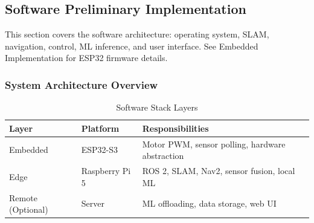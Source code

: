 
\subsection{Software Preliminary Implementation}


This section covers the software architecture: operating system, SLAM, navigation, control, ML inference, and user interface. See Embedded Implementation for ESP32 firmware details.

\subsubsection{System Architecture Overview}

\begin{table}[H]
\centering
\caption{Software Stack Layers}
\begin{tabular}{@{}llp{6cm}@{}}
\toprule
\textbf{Layer} & \textbf{Platform} & \textbf{Responsibilities} \\
\midrule
Embedded & ESP32-S3 & Motor PWM, sensor polling, hardware abstraction \\
Edge & Raspberry Pi 5 & ROS 2, SLAM, Nav2, sensor fusion, local ML \\
Remote (Optional) & Server & ML offloading, data storage, web UI \\
\bottomrule
\end{tabular}
\end{table}

